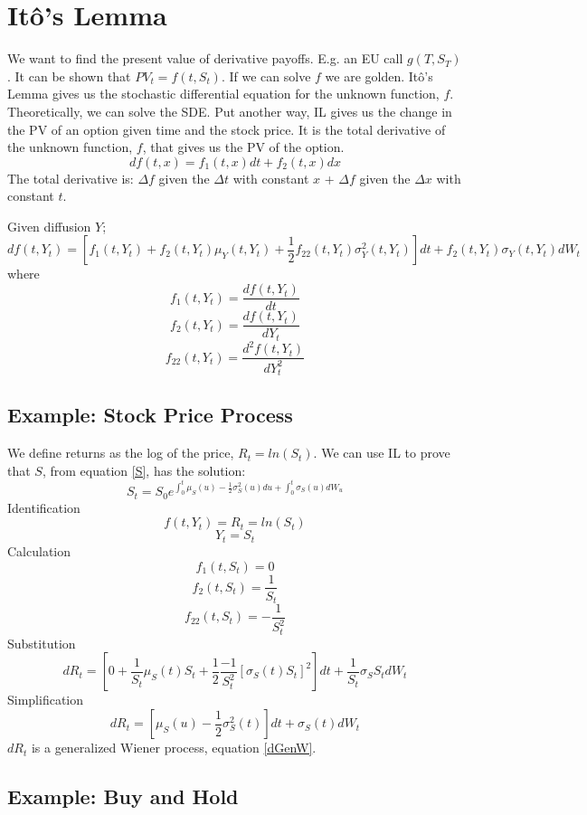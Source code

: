 
\section{It\^o's Lemma}

We want to find the present value of derivative payoffs. E.g. an EU call
$g(T, S_T)$. It can be shown that $PV_t=f(t, S_t)$. If we can solve $f$ we are
golden. It\^o's Lemma gives us the stochastic differential equation for the
unknown function, $f$. Theoretically, we can solve the SDE. Put another way,
IL gives us the change in the PV of an option given time and the stock price.
It is the total derivative of the unknown function, $f$, that gives us the PV
of the option.
\[df(t,x)=f_1(t,x)dt+f_2(t,x)dx\]
The total derivative is: $\Delta f$ given the $\Delta t$ with constant $x$ +
$\Delta f$ given the $\Delta x$ with constant $t$.

Given diffusion $Y$;
\begin{equation} \label{IL}
    df(t, Y_t) = \left[ f_1(t,Y_t)+f_2(t,Y_t) \mu_Y (t,Y_t)+ \frac{1}{2} f_{22}
    (t,Y_t) \sigma_Y^2 (t,Y_t) \right] dt+f_2(t,Y_t)\sigma_Y (t,Y_t)dW_t
\end{equation}
where
\[f_1(t, Y_t)=\frac{df(t,Y_t)}{dt}\]
\[f_2(t, Y_t)=\frac{df(t,Y_t)}{dY_t}\]
\[f_{22}(t, Y_t)=\frac{d^2f(t,Y_t)}{dY_t^2}\]

\subsection{Example: Stock Price Process}

We define returns as the log of the price, $R_t=ln(S_t)$. We can use IL to
prove that $S$, from equation \ref{S}, has the solution:
\[
    S_t=S_0e^{\int_0^t\mu_S(u)-\frac{1}{2}\sigma_S^2(u)du+
    \int_0^t\sigma_S(u)dW_u}
\]
Identification
\[f(t,Y_t)=R_t=ln(S_t)\]
\[Y_t=S_t\]
Calculation
\[f_1(t,S_t)=0\]
\[f_2(t, S_t)=\frac{1}{S_t}\]
\[f_{22}(t,S_t)=-\frac{1}{S_t^2}\]
Substitution
\[
    dR_t=\left[ 0+\frac{1}{S_t}\mu_S(t)S_t+\frac{1}{2}\frac{-1}{S_t^2}
    \left[ \sigma_S(t)S_t \right] ^2 \right] dt+ \frac{1}{S_t}\sigma_SS_tdW_t
\]
Simplification
\[
    dR_t= \left[ \mu_S(u)-\frac{1}{2}\sigma_S^2(t) \right] dt + \sigma_S(t)dW_t
\]
$dR_t$ is a generalized Wiener process, equation \ref{dGenW}.

\subsection{Example: Buy and Hold}

